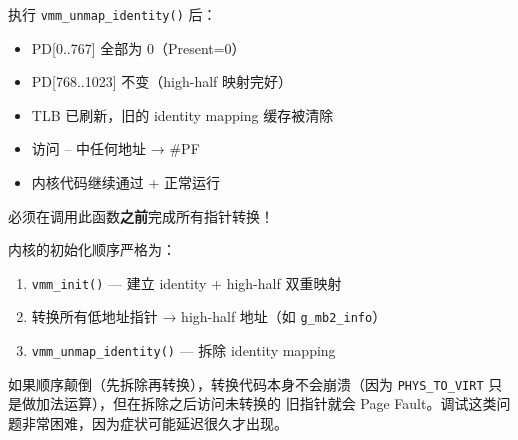 \begin{cpustate}
执行 \texttt{vmm\_unmap\_identity()} 后：
\begin{itemize}
  \item PD[0..767] 全部为 0（Present=0）
  \item PD[768..1023] 不变（high-half 映射完好）
  \item TLB 已刷新，旧的 identity mapping 缓存被清除
  \item 访问 -- 中任何地址 → \#PF
  \item 内核代码继续通过 + 正常运行
\end{itemize}
\end{cpustate}

\begin{warnbox}
必须在调用此函数\textbf{之前}完成所有指针转换！

内核的初始化顺序严格为：
\begin{enumerate}
  \item \texttt{vmm\_init()} — 建立 identity + high-half 双重映射
  \item 转换所有低地址指针 → high-half 地址（如 \texttt{g\_mb2\_info}）
  \item \texttt{vmm\_unmap\_identity()} — 拆除 identity mapping
\end{enumerate}

如果顺序颠倒（先拆除再转换），转换代码本身不会崩溃（因为
\texttt{PHYS\_TO\_VIRT} 只是做加法运算），但在拆除之后访问未转换的
旧指针就会 Page Fault。调试这类问题非常困难，因为症状可能延迟很久才出现。
\end{warnbox}


